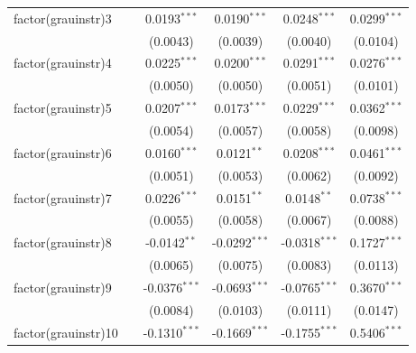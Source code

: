 \begin{tabular}{lccccc}
   factor(grauinstr)3       &                & 0.0193$^{***}$          & 0.0190$^{***}$          & 0.0248$^{***}$          & 0.0299$^{***}$\\   
                            &                & (0.0043)                & (0.0039)                & (0.0040)                & (0.0104)\\   
   factor(grauinstr)4       &                & 0.0225$^{***}$          & 0.0200$^{***}$          & 0.0291$^{***}$          & 0.0276$^{***}$\\   
                            &                & (0.0050)                & (0.0050)                & (0.0051)                & (0.0101)\\   
   factor(grauinstr)5       &                & 0.0207$^{***}$          & 0.0173$^{***}$          & 0.0229$^{***}$          & 0.0362$^{***}$\\   
                            &                & (0.0054)                & (0.0057)                & (0.0058)                & (0.0098)\\   
   factor(grauinstr)6       &                & 0.0160$^{***}$          & 0.0121$^{**}$           & 0.0208$^{***}$          & 0.0461$^{***}$\\   
                            &                & (0.0051)                & (0.0053)                & (0.0062)                & (0.0092)\\   
   factor(grauinstr)7       &                & 0.0226$^{***}$          & 0.0151$^{**}$           & 0.0148$^{**}$           & 0.0738$^{***}$\\   
                            &                & (0.0055)                & (0.0058)                & (0.0067)                & (0.0088)\\   
   factor(grauinstr)8       &                & -0.0142$^{**}$          & -0.0292$^{***}$         & -0.0318$^{***}$         & 0.1727$^{***}$\\   
                            &                & (0.0065)                & (0.0075)                & (0.0083)                & (0.0113)\\   
   factor(grauinstr)9       &                & -0.0376$^{***}$         & -0.0693$^{***}$         & -0.0765$^{***}$         & 0.3670$^{***}$\\   
                            &                & (0.0084)                & (0.0103)                & (0.0111)                & (0.0147)\\   
   factor(grauinstr)10      &                & -0.1310$^{***}$         & -0.1669$^{***}$         & -0.1755$^{***}$         & 0.5406$^{***}$\\   

\end{tabular}

